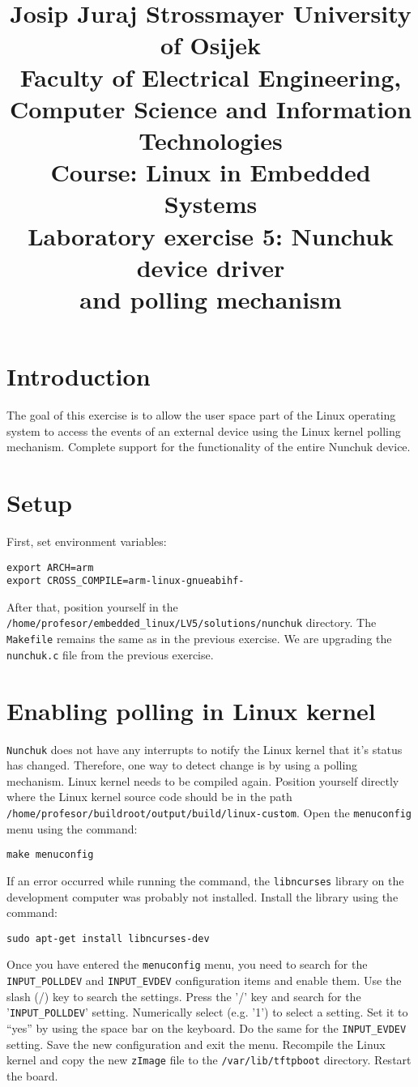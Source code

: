 \documentclass[11pt]{article}
\title{
	\Large Josip Juraj Strossmayer University of Osijek \\
	Faculty of Electrical Engineering, Computer Science and Information
	 Technologies\\
	\vspace{4cm}
	\Large Course: Linux in Embedded Systems \\
	\vspace{4cm}
	\Large \textbf{Laboratory exercise 5: Nunchuk device driver\\
					and polling mechanism}
	}
\date{}
\begin{document}
\maketitle
\thispagestyle{empty}
\newpage

\section{Introduction}
The goal of this exercise is to allow the user space part of the Linux
operating system to access the events of an external device using the Linux
kernel polling mechanism. Complete support for the functionality of the entire
Nunchuk device.

\section{Setup}
First, set environment variables:
\begin{lstlisting}
export ARCH=arm
export CROSS_COMPILE=arm-linux-gnueabihf-
\end{lstlisting}
After that, position yourself in the \texttt{/home/profesor/embedded\_linux/LV5/solutions/nunchuk}
directory.
The \texttt{Makefile} remains the same as in the previous exercise. We are
upgrading the \texttt{nunchuk.c} file from the previous exercise.

\section{Enabling polling in Linux kernel}
\texttt{Nunchuk} does not have any interrupts to notify the Linux kernel that
 it's status has changed. Therefore, one way to detect change is by using a
 polling mechanism.
\newline
\newline
Linux kernel needs to be compiled again. Position yourself directly
where the Linux kernel source code should be in the path
 \texttt{/home/profesor/buildroot/output/build/linux-custom}. Open the
 \texttt{menuconfig} menu using the command:
\begin{lstlisting}
make menuconfig
\end{lstlisting}
If an error occurred while running the command, the \texttt{libncurses} library
 on the development computer was probably not installed. Install the library
 using the command:
\begin{lstlisting}
sudo apt-get install libncurses-dev
\end{lstlisting}
Once you have entered the \texttt{menuconfig} menu, you need to search for the
\texttt{INPUT\_POLLDEV} and \texttt{INPUT\_EVDEV} configuration items and enable
them. Use the slash (/) key to search the settings. Press the '/' key and search
for the '\texttt{INPUT\_POLLDEV}' setting. Numerically select (e.g. '1') to
 select a setting. Set it to “yes” by using the space bar on the keyboard. Do
 the same for the \texttt{INPUT\_EVDEV} setting. Save the new configuration and
 exit the menu. Recompile the Linux kernel and copy the new \texttt{zImage}
 file to the \texttt{/var/lib/tftpboot} directory. Restart the board.
\end{document}
